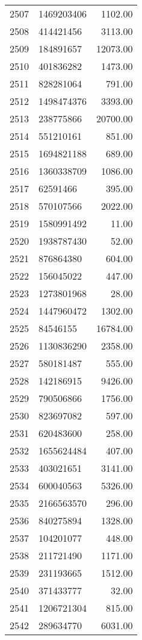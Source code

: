 \begin{table}[ht]
\begin{tabular}{rlr}
  2507 & 1469203406 & 1102.00 \\ 
  2508 & 414421456 & 3113.00 \\ 
  2509 & 184891657 & 12073.00 \\ 
  2510 & 401836282 & 1473.00 \\ 
  2511 & 828281064 & 791.00 \\ 
  2512 & 1498474376 & 3393.00 \\ 
  2513 & 238775866 & 20700.00 \\ 
  2514 & 551210161 & 851.00 \\ 
  2515 & 1694821188 & 689.00 \\ 
  2516 & 1360338709 & 1086.00 \\ 
  2517 & 62591466 & 395.00 \\ 
  2518 & 570107566 & 2022.00 \\ 
  2519 & 1580991492 & 11.00 \\ 
  2520 & 1938787430 & 52.00 \\ 
  2521 & 876864380 & 604.00 \\ 
  2522 & 156045022 & 447.00 \\ 
  2523 & 1273801968 & 28.00 \\ 
  2524 & 1447960472 & 1302.00 \\ 
  2525 & 84546155 & 16784.00 \\ 
  2526 & 1130836290 & 2358.00 \\ 
  2527 & 580181487 & 555.00 \\ 
  2528 & 142186915 & 9426.00 \\ 
  2529 & 790506866 & 1756.00 \\ 
  2530 & 823697082 & 597.00 \\ 
  2531 & 620483600 & 258.00 \\ 
  2532 & 1655624484 & 407.00 \\ 
  2533 & 403021651 & 3141.00 \\ 
  2534 & 600040563 & 5326.00 \\ 
  2535 & 2166563570 & 296.00 \\ 
  2536 & 840275894 & 1328.00 \\ 
  2537 & 104201077 & 448.00 \\ 
  2538 & 211721490 & 1171.00 \\ 
  2539 & 231193665 & 1512.00 \\ 
  2540 & 371433777 & 32.00 \\ 
  2541 & 1206721304 & 815.00 \\ 
  2542 & 289634770 & 6031.00 \\ 

\end{tabular}
\end{table}
